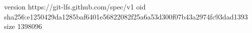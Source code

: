 version https://git-lfs.github.com/spec/v1
oid sha256:e1250429da1285baf6401e56822082f25a6a53d300f07b43a2974fc93dad1393
size 1398096
